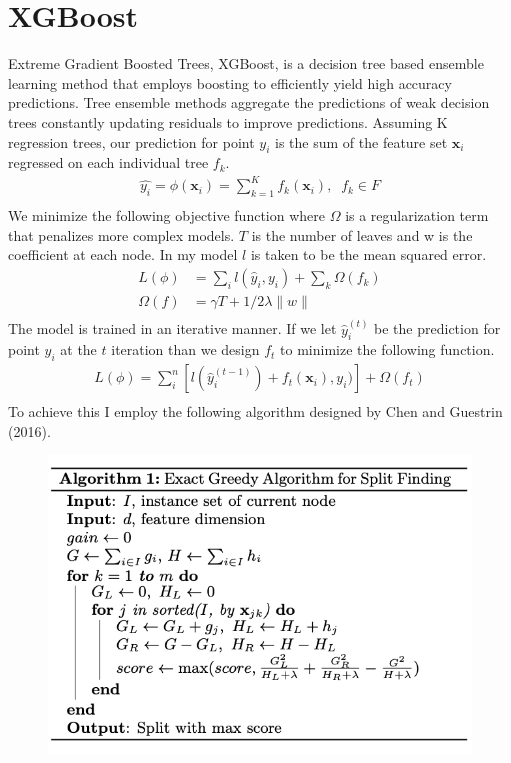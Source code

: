 \documentclass[12pt,twoside]{dukestatscithesis}
\begin{document}
\section{XGBoost}\label{xgboost}

Extreme Gradient Boosted Trees, XGBoost, is a decision tree based
ensemble learning method that employs boosting to efficiently yield high
accuracy predictions. Tree ensemble methods aggregate the predictions of
weak decision trees constantly updating residuals to improve
predictions. Assuming K regression trees, our prediction for point
\(y_i\) is the sum of the feature set \(\textbf{x}_i\) regressed on each
individual tree \(f_k\).
\begin{align}
  \hat{y_i} = \phi(\textbf{x}_i) = \sum_{k=1}^{K} f_k(\textbf{x}_i), \; \; f_k \in F \label{eq:1} \\ 
\end{align}
We minimize the following objective function where \(\Omega\) is a
regularization term that penalizes more complex models. \(T\) is the
number of leaves and w is the coefficient at each node. In my model
\(l\) is taken to be the mean squared error.
\begin{align}
  L(\phi) &= \sum_{i}^{} l(\hat{y}_i, y_i) + \sum_{k}^{} \Omega(f_k) \label{eq:2} \\ 
  \Omega(f) &= \gamma T +1/2 \lambda \| w \|\label{eq:3} \\ 
\end{align}
The model is trained in an iterative manner. If we let \(\hat{y}_i^(t)\)
be the prediction for point \(y_i\) at the \(t\) iteration than we
design \(f_t\) to minimize the following function.
\begin{align}
  L(\phi) = \sum_{i}^{n} [l(\hat{y}_i^{(t-1)}) + f_t(\textbf{x}_i), y_i)] + \Omega(f_t) \label{eq:4} \\ 
\end{align}
To achieve this I employ the following algorithm designed by Chen and
Guestrin (2016).
\begin{figure}
\centering
\includegraphics{figure/xgboost_algorithm.png}
\caption{}
\end{figure}
\end{document}
